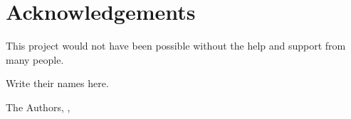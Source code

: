 \section*{Acknowledgements}
This project would not have been possible without the help and support from many people.

Write their names here.


\vspace{3cm}
\hfill The Authors, \AuthorUniversityCity, \monthname \the\year
